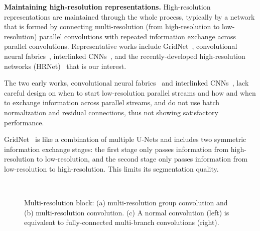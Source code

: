 \documentclass[10pt,twocolumn,letterpaper]{article}
\begin{document}
\vspace{.1cm}
\noindent\textbf{Maintaining high-resolution representations.}
High-resolution representations
are maintained through the whole process,
typically by a network that is formed
by connecting multi-resolution (from high-resolution to low-resolution) parallel convolutions
with repeated information exchange across parallel convolutions.
Representative works include GridNet~\cite{FourureEFMT017}, convolutional neural fabrics~\cite{SaxenaV16}, interlinked CNNs~\cite{ZhouHZ15},
and the recently-developed high-resolution networks (HRNet)~\cite{SunXLW19}
that is our interest.

The two early works, convolutional neural fabrics~\cite{SaxenaV16}
and interlinked CNNs~\cite{ZhouHZ15},
lack careful design
on when to start low-resolution parallel streams
and how and when to exchange information across parallel streams,
and do not use batch normalization and residual connections,
thus not showing satisfactory performance.

GridNet~\cite{FourureEFMT017}
is like a combination of multiple U-Nets
and includes two symmetric information exchange stages:
the first stage only passes information from high-resolution
to low-resolution,
and the second stage only passes information
from low-resolution to high-resolution.
This limits its segmentation quality.






\begin{figure}[t]
    \centering
    \footnotesize
   ~~
    ~~
    \caption{Multi-resolution block:
    (a) multi-resolution group convolution and (b) multi-resolution convolution.
    (c) A normal convolution (left) is equivalent to
    fully-connected multi-branch convolutions (right).}
    \label{fig:multiresolutionblock}
    \vspace{-3mm}
\end{figure}
\end{document}
